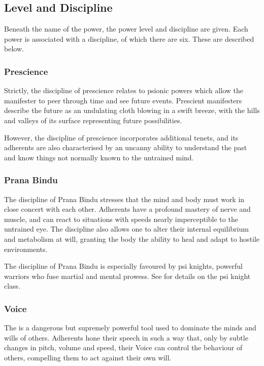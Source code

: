 \subsection{Level and Discipline}
Beneath the name of the power,
the power level and discipline are given.
Each power is associated with a discipline,
of which there are six.
These are described below.

\subsubsection{Prescience}
Strictly, the discipline of prescience relates to psionic powers
which allow the manifester to peer through time and see future events.
Prescient manifesters describe the future as
an undulating cloth blowing in a swift breeze,
with the hills and valleys of its surface representing
future possibilities. 

However,
the discipline of prescience incorporates additional tenets,
and its adherents are also characterised by an uncanny ability to
understand the past and know things not normally known to
the untrained mind.

\subsubsection{Prana Bindu}
The discipline of Prana Bindu stresses that the mind and body
must work in close concert with each other.
Adherents have a profound mastery of nerve and muscle,
and can react to situations with speeds nearly imperceptible
to the untrained eye.
The discipline also allows one to alter their internal equilibrium
and metabolism at will,
granting the body the ability to heal and adapt to hostile environments.

The discipline of Prana Bindu is especially favoured by psi knights,
powerful warriors who fuse martial and mental prowess.
See  for details on the psi knight class.

\subsubsection{Voice}
The  is a dangerous but supremely powerful tool
used to dominate the minds and wills of others.
Adherents hone their speech in such a way that,
only by subtle changes in pitch, volume and speed,
their Voice can control the behaviour of others,
compelling them to act against their own will.


